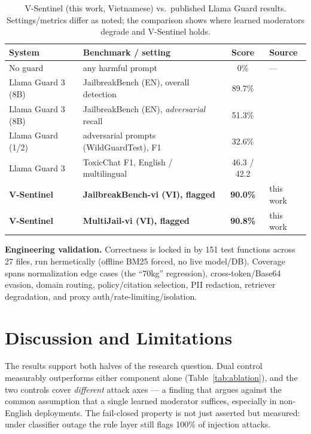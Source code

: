 \documentclass[11pt, a4paper]{article}
\begin{document}
\begin{table}[H]
    \centering
    \caption{V-Sentinel (this work, Vietnamese) vs.\ published Llama Guard results. Settings/metrics differ as noted; the comparison shows where learned moderators degrade and V-Sentinel holds.}
    \label{tab:baseline}
    \begin{tabularx}{\textwidth}{l X c l}
        \toprule
        \textbf{System} & \textbf{Benchmark / setting} & \textbf{Score} & \textbf{Source} \\
        \midrule
        No guard            & any harmful prompt                              & 0\%    & --- \\
        Llama Guard 3 (8B)  & JailbreakBench (EN), overall detection          & 89.7\% & \cite{reflectguard} \\
        Llama Guard 3 (8B)  & JailbreakBench (EN), \emph{adversarial} recall   & 51.3\% & \cite{reflectguard} \\
        Llama Guard (1/2)   & adversarial prompts (WildGuardTest), F1         & 32.6\% & \cite{wildguard} \\
        Llama Guard 3       & ToxicChat F1, English / multilingual            & 46.3 / 42.2 & \cite{multitox} \\
        \textbf{V-Sentinel} & \textbf{JailbreakBench-vi (VI), flagged}         & \textbf{90.0\%} & this work \\
        \textbf{V-Sentinel} & \textbf{MultiJail-vi (VI), flagged}              & \textbf{90.8\%} & this work \\
        \bottomrule
    \end{tabularx}
\end{table}

\noindent\textbf{Engineering validation.} Correctness is locked in by 151 test functions across 27 files, run hermetically (offline BM25 forced, no live model/DB). Coverage spans normalization edge cases (the ``70kg'' regression), cross-token/Base64 evasion, domain routing, policy/citation selection, PII redaction, retriever degradation, and proxy auth/rate-limiting/isolation.

\section{Discussion and Limitations}
The results support both halves of the research question. Dual control measurably outperforms either component alone (Table~\ref{tab:ablation}), and the two controls cover \emph{different} attack axes --- a finding that argues against the common assumption that a single learned moderator suffices, especially in non-English deployments. The fail-closed property is not just asserted but measured: under classifier outage the rule layer still flags 100\% of injection attacks.
\end{document}
